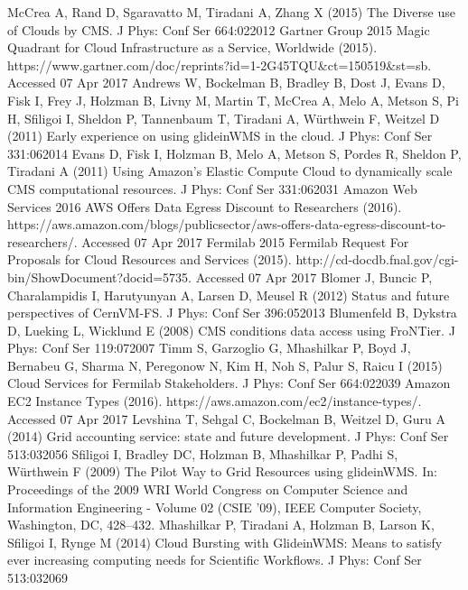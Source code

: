 \documentclass[twocolumn]{svjour3}          %
\begin{document}
\begin{thebibliography}{15}
McCrea A, Rand D, Sgaravatto M, Tiradani A, Zhang X (2015) The Diverse use of Clouds by CMS.  J Phys: Conf Ser 664:022012
 Gartner Group 2015 Magic Quadrant for Cloud Infrastructure as a Service, Worldwide (2015). https://www.gartner.com/doc/reprints?id=1-2G45TQU\&ct=150519\&st=sb. Accessed 07 Apr 2017 
 Andrews W, Bockelman B, Bradley B, Dost J, Evans D, Fisk I, Frey J, Holzman B, Livny M, Martin T, McCrea A, Melo A, Metson S, Pi H, Sfiligoi I, Sheldon P, Tannenbaum T, Tiradani A, W\"urthwein F, Weitzel D (2011) Early experience on using glideinWMS in the cloud.  J Phys: Conf Ser 331:062014
 Evans D, Fisk I, Holzman B, Melo A, Metson S, Pordes R, Sheldon P, Tiradani A (2011) Using Amazon's Elastic Compute Cloud to dynamically scale CMS computational
resources. J Phys: Conf Ser 331:062031
 Amazon Web Services 2016 AWS Offers Data Egress Discount to Researchers (2016). https://aws.amazon.com/blogs/publicsector/aws-offers-data-egress-discount-to-researchers/. Accessed 07 Apr 2017
 Fermilab 2015 Fermilab Request For Proposals for Cloud Resources and Services (2015). http://cd-docdb.fnal.gov/cgi-bin/ShowDocument?docid=5735. Accessed 07 Apr 2017
 Blomer J, Buncic P, Charalampidis I, Harutyunyan A, Larsen D, Meusel R (2012) Status and future perspectives of CernVM-FS. J Phys: Conf Ser 396:052013
 Blumenfeld B, Dykstra D, Lueking L, Wicklund E (2008) CMS conditions data access using FroNTier. J Phys: Conf Ser 119:072007
 Timm S, Garzoglio G, Mhashilkar P, Boyd J, Bernabeu G, Sharma N, Peregonow N, Kim H, Noh S, Palur S, Raicu I (2015) Cloud Services for Fermilab Stakeholders. J Phys: Conf Ser 664:022039
 Amazon EC2 Instance Types (2016). https://aws.amazon.com/ec2/instance-types/. Accessed 07 Apr 2017
 Levshina T, Sehgal C, Bockelman B, Weitzel D, Guru A (2014) Grid accounting service: state and future development. J Phys: Conf Ser 513:032056
 Sfiligoi I, Bradley DC, Holzman B, Mhashilkar P, Padhi S, W\"urthwein F (2009) The Pilot Way to Grid Resources using glideinWMS.
In: Proceedings of the 2009 WRI World Congress on Computer Science and Information Engineering - Volume 02 (CSIE '09), IEEE Computer Society, Washington, DC, 428--432.
 Mhashilkar P, Tiradani A, Holzman B, Larson K, Sfiligoi I, Rynge M (2014) Cloud Bursting with GlideinWMS: Means to satisfy ever increasing computing needs for Scientific Workflows. J Phys: Conf Ser 513:032069

\end{thebibliography}
\end{document}
